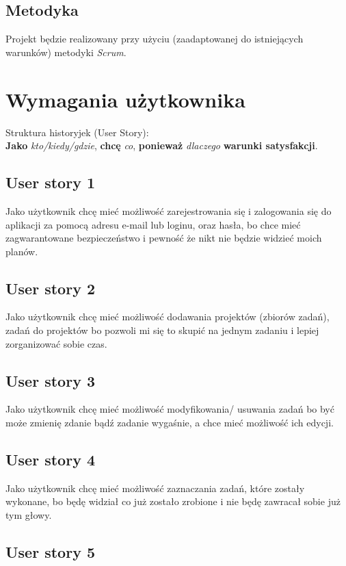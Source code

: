﻿\documentclass[a4paper]{article}
\begin{document}
\subsection{Metodyka}
\label{subsec:Metodyka}

Projekt będzie realizowany przy użyciu (zaadaptowanej do istniejących warunków) metodyki {\em Scrum}. 

\section{Wymagania użytkownika}
\label{sec:WymaganiaUzytkownika}
Struktura historyjek (User Story):\\
\textbf{Jako} \textit{kto/kiedy/gdzie}, \textbf{chcę} \textit{co}, \textbf{ponieważ}  \textit{dlaczego} \textbf{warunki satysfakcji}.

\subsection{User story 1}
\label{subsec:UserStory1}
Jako użytkownik chcę mieć możliwość zarejestrowania się i zalogowania się do aplikacji za pomocą adresu e-mail lub loginu, oraz hasła, bo chce mieć zagwarantowane bezpieczeństwo i pewność że nikt nie będzie widzieć moich planów.

\subsection{User story 2}
\label{subsec:UserStory2}
Jako użytkownik chcę mieć możliwość dodawania projektów (zbiorów zadań), zadań do projektów bo pozwoli mi się to skupić na jednym zadaniu i lepiej zorganizować sobie czas.

\subsection{User story 3}
\label{subsec:UserStory3}
Jako użytkownik chcę mieć możliwość modyfikowania/ usuwania zadań bo być może zmienię zdanie bądź zadanie wygaśnie, a chce mieć możliwość ich edycji.

\subsection{User story 4}
\label{subsec:UserStory4}
Jako użytkownik chcę mieć możliwość zaznaczania zadań, które zostały wykonane, bo będę widział co już zostało zrobione i nie będę zawracał sobie już tym głowy.

\subsection{User story 5}
\label{subsec:UserStory5}
\end{document}
